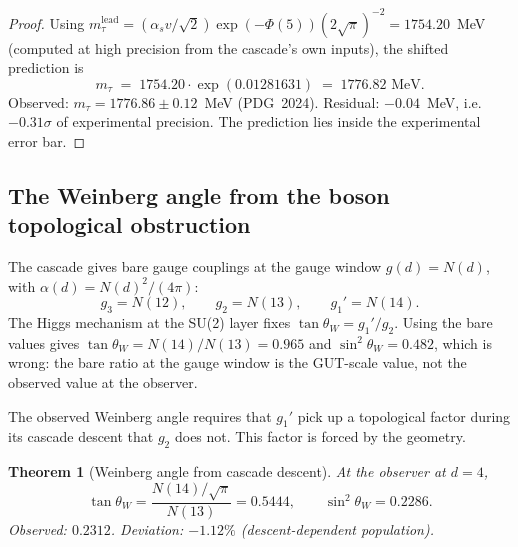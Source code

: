 \documentclass[12pt,a4paper]{article}
\newtheorem{theorem}{Theorem}[section]
\begin{document}
\begin{proof}
Using $m_\tau^{\text{lead}}=(\alpha_s v/\sqrt{2})\exp(-\Phi(5))(2\sqrt{\pi})^{-2}=1754.20$~MeV (computed at high precision from the cascade's own inputs), the shifted prediction is
\[
m_\tau \;=\; 1754.20\cdot\exp(0.01281631) \;=\; 1776.82\text{~MeV}.
\]
Observed: $m_\tau=1776.86\pm 0.12$~MeV (PDG~2024). Residual: $-0.04$~MeV, i.e.\ $-0.31\sigma$ of experimental precision. The prediction lies inside the experimental error bar.
\end{proof}


\subsection{The Weinberg angle from the boson topological obstruction}

The cascade gives bare gauge couplings at the gauge window
$g(d) = N(d)$, with $\alpha(d) = N(d)^2/(4\pi)$:
\[
g_3 = N(12),\qquad g_2 = N(13),\qquad g_1' = N(14).
\]
The Higgs mechanism at the SU(2) layer fixes $\tan\theta_W = g_1'/g_2$.
Using the bare values gives $\tan\theta_W = N(14)/N(13) = 0.965$ and
$\sin^2\theta_W = 0.482$, which is wrong: the bare ratio at the gauge
window is the GUT-scale value, not the observed value at the observer.

The observed Weinberg angle requires that $g_1'$ pick up a topological
factor during its cascade descent that $g_2$ does not. This factor is
forced by the geometry.

\begin{theorem}[Weinberg angle from cascade descent]\label{thm:weinberg}
At the observer at $d=4$,
\[
\tan\theta_W = \frac{N(14)/\sqrt{\pi}}{N(13)} = 0.5444,
\qquad
\sin^2\theta_W = 0.2286.
\]
Observed: $0.2312$. Deviation: $-1.12\%$ (descent-dependent population).
\end{theorem}
\end{document}
